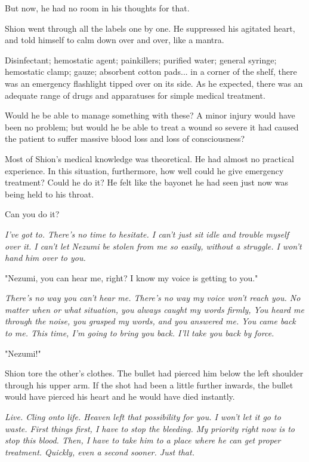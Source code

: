 But now, he had no room in his thoughts for that.

Shion went through all the labels one by one. He suppressed his agitated
heart, and told himself to calm down over and over, like a mantra.

Disinfectant; hemostatic agent; painkillers; purified water; general
syringe; hemostatic clamp; gauze; absorbent cotton pads... in a corner
of the shelf, there was an emergency flashlight tipped over on its side.
As he expected, there was an adequate range of drugs and apparatuses for
simple medical treatment.

Would he be able to manage something with these? A minor injury would
have been no problem; but would he be able to treat a wound so severe it
had caused the patient to suffer massive blood loss and loss of
consciousness?

Most of Shion's medical knowledge was theoretical. He had almost no
practical experience. In this situation, furthermore, how well could he
give emergency treatment? Could he do it? He felt like the bayonet he
had seen just now was being held to his throat.

Can you do it?

\emph{I've got to. There's no time to hesitate. I can't just sit idle and
	trouble myself over it. I can't let Nezumi be stolen from me so easily,
	without a struggle. I won't hand him over to you.}

"Nezumi, you can hear me, right? I know my voice is getting to you."

\emph{There's no way you can't hear me. There's no way my voice won't reach
	you. No matter when or what situation, you always caught my words
	firmly, You heard me through the noise, you grasped my words, and you
	answered me. You came back to me. This time, I'm going to bring you
	back. I'll take you back by force.}

"Nezumi!"

Shion tore the other's clothes. The bullet had pierced him below the
left shoulder through his upper arm. If the shot had been a little
further inwards, the bullet would have pierced his heart and he would
have died instantly.

\emph{Live. Cling onto life. Heaven left that possibility for you. I won't let
	it go to waste. First things first, I have to stop the bleeding. My
	priority right now is to stop this blood. Then, I have to take him to a
	place where he can get proper treatment. Quickly, even a second sooner.
	Just that.}

